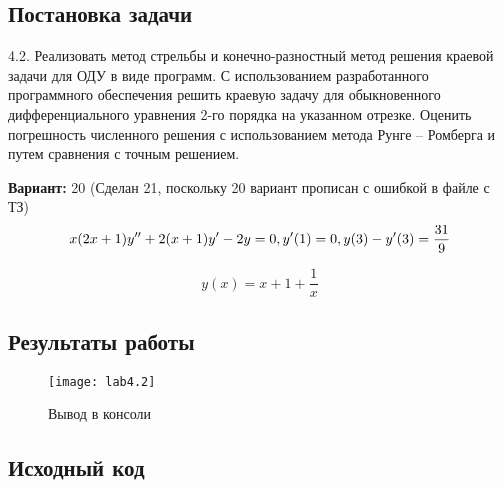 \subsection{Постановка задачи}
4.2. Реализовать метод стрельбы и конечно-разностный метод решения краевой задачи для ОДУ в виде программ. С использованием разработанного программного обеспечения решить краевую задачу для обыкновенного дифференциального уравнения 2-го порядка на указанном отрезке. Оценить погрешность численного решения с использованием метода Рунге – Ромберга и путем сравнения с точным решением. 

{\bfseries Вариант:} 20 (Сделан 21, поскольку 20 вариант прописан с ошибкой в файле с ТЗ)
    \begin{equation}
        x(2x+1)y'' + 2(x+1)y' - 2y = 0,\\
		y'(1)=0,\\
		y(3)-y'(3)=\frac{31}{9}
    \end{equation}
    
    \begin{equation}
		y(x) = x+1+\frac{1}{x}
    \end{equation}
\pagebreak

\subsection{Результаты работы}
\begin{figure}[h!]
\centering
\texttt{[image: lab4.2]}
\caption{Вывод в консоли}
\end{figure}


\subsection{Исходный код}

\pagebreak